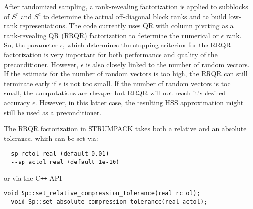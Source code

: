 \documentclass{article}
\begin{document}
After randomized sampling, a rank-revealing factorization is applied
to subblocks of $S^r$ and $S^c$ to determine the actual off-diagonal
block ranks and to build low-rank representations. The code currently
uses QR with column pivoting as a rank-revealing QR (RRQR)
factorization to determine the numerical or $\epsilon$ rank. So, the
parameter $\epsilon$, which determines the stopping criterion for the
RRQR factorization is very important for both performance and quality
of the preconditioner. However, $\epsilon$ is also closely linked to
the number of random vectors. If the estimate for the number of random
vectors is too high, the RRQR can still terminate early if $\epsilon$
is not too small. If the number of random vectors is too small, the
computations are cheaper but RRQR will not reach it's desired accuracy
$\epsilon$. However, in this latter case, the resulting HSS
approximation might still be used as a preconditioner.

The RRQR factorization in STRUMPACK takes both a relative and an
absolute tolerance, which can be set via:
\begin{lstlisting}[style=Bash]
  --sp_rctol real (default 0.01)
  --sp_actol real (default 1e-10)
\end{lstlisting}
or via the C\texttt{++} API
\begin{lstlisting}[style=C]
  void Sp::set_relative_compression_tolerance(real rctol);
  void Sp::set_absolute_compression_tolerance(real actol);
\end{lstlisting}
\end{document}
